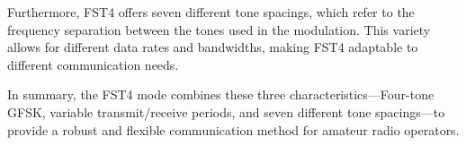 Furthermore, FST4 offers seven different tone spacings, which refer to the frequency separation between the tones used in the modulation. This variety allows for different data rates and bandwidths, making FST4 adaptable to different communication needs.

In summary, the FST4 mode combines these three characteristics—Four-tone GFSK, variable transmit/receive periods, and seven different tone spacings—to provide a robust and flexible communication method for amateur radio operators.

